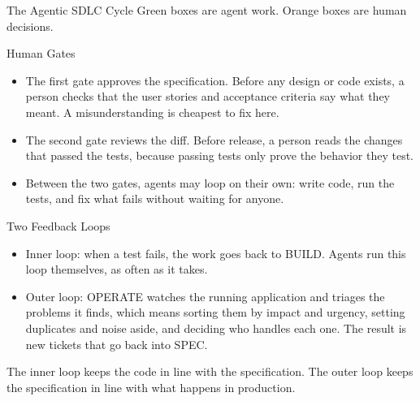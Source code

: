 \documentclass[aspectratio=169, table, 12pt]{beamer}
\begin{document}
\begin{frame}{{\Large The Agentic SDLC Cycle}}
  \vspace{6pt}
  {\footnotesize Green boxes are agent work. Orange boxes are human decisions.}
\end{frame}

\begin{frame}{{\Large Human Gates}}
  \vspace{10pt}
  \begin{itemize}
    \item The first gate approves the specification. Before any design or
          code exists, a person checks that the user stories and acceptance
          criteria say what they meant. A misunderstanding is cheapest to fix
          here.
    \item The second gate reviews the diff. Before release, a person reads the
          changes that passed the tests, because passing tests only prove the
          behavior they test.
    \item Between the two gates, agents may loop on their own: write code, run
          the tests, and fix what fails without waiting for anyone.
  \end{itemize}
\end{frame}

\begin{frame}{{\Large Two Feedback Loops}}
  \vspace{10pt}
  \begin{itemize}
    \item Inner loop: when a test fails, the work goes back to BUILD. Agents
          run this loop themselves, as often as it takes.
    \item Outer loop: OPERATE watches the running application and triages
          the problems it finds, which means sorting them by impact and
          urgency, setting duplicates and noise aside, and deciding who
          handles each one. The result is new tickets that go back into
          SPEC.
  \end{itemize}
  \vspace{8pt}
  {\small The inner loop keeps the code in line with the specification. The
  outer loop keeps the specification in line with what happens in
  production.}
\end{frame}
\end{document}
